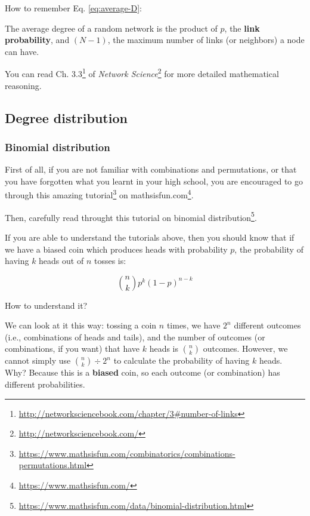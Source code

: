 \documentclass[
]{krantz}
\makeatletter
\renewcommand{\href}[2]{#2\footnote{\url{#1}}}
\newenvironment{kframe}{%
\medskip{}
\setlength{\fboxsep}{.8em}
 \def\at@end@of@kframe{}%
 \ifinner\ifhmode%
  \def\at@end@of@kframe{\end{minipage}}%
  \begin{minipage}{\columnwidth}%
 \fi\fi%
 \def\FrameCommand##1{\hskip\@totalleftmargin \hskip-\fboxsep
 \colorbox{shadecolor}{##1}\hskip-\fboxsep
     \hskip-\linewidth \hskip-\@totalleftmargin \hskip\columnwidth}%
 \MakeFramed {\advance\hsize-\width
   \@totalleftmargin\z@ \linewidth\hsize
   \@setminipage}}%
 {\par\unskip\endMakeFramed%
 \at@end@of@kframe}
\newenvironment{rmdblock}[1]
  {
  \begin{itemize}
  \renewcommand{\labelitemi}{
    \raisebox{-.7\height}[0pt][0pt]{
      {\setkeys{Gin}{width=3em,keepaspectratio}\texttt{[image: images/\#1]}}
    }
  }
  \setlength{\fboxsep}{1em}
  \begin{kframe}
  \item
  }
  {
  \end{kframe}
  \end{itemize}
  }
\newenvironment{rmdtip}
  {\begin{rmdblock}{tip}}
  {\end{rmdblock}}
\makeatother
\begin{document}
\begin{rmdtip}
How to remember Eq. \eqref{eq:average-D}:

The average degree of a random network is the product of \(p\), the \textbf{link probability}, and \((N-1)\), the maximum number of links (or neighbors) a node can have.
\end{rmdtip}

You can read \href{http://networksciencebook.com/chapter/3\#number-of-links}{Ch. 3.3} of \href{http://networksciencebook.com/}{\emph{Network Science}} for more detailed mathematical reasoning.

\hypertarget{degree-distribution-1}{%
\subsection{Degree distribution}\label{degree-distribution-1}}

\hypertarget{binomial-distribution}{%
\subsubsection{Binomial distribution}\label{binomial-distribution}}

First of all, if you are not familiar with combinations and permutations, or that you have forgotten what you learnt in your high school, you are encouraged to go through \href{https://www.mathsisfun.com/combinatorics/combinations-permutations.html}{this amazing tutorial} on \href{https://www.mathsisfun.com/}{mathsisfun.com}.

Then, carefully read throught \href{https://www.mathsisfun.com/data/binomial-distribution.html}{this tutorial on binomial distribution}.

If you are able to understand the tutorials above, then you should know that if we have a biased coin which produces heads with probability \(p\), the probability of having \(k\) heads out of \(n\) tosses is:

\begin{equation}
  {n \choose k}p^k(1-p)^{n-k} \label{eq:coin-tossing-binomial}
\end{equation}

How to understand it?

We can look at it this way: tossing a coin \(n\) times, we have \(2^n\) different outcomes (i.e., combinations of heads and tails), and the number of outcomes (or combinations, if you want) that have \(k\) heads is \(n\choose k\) outcomes. However, we cannot simply use \({n\choose k}\div{2^n}\) to calculate the probability of having \(k\) heads. Why? Because this is a \textbf{biased} coin, so each outcome (or combination) has different probabilities.
\end{document}
